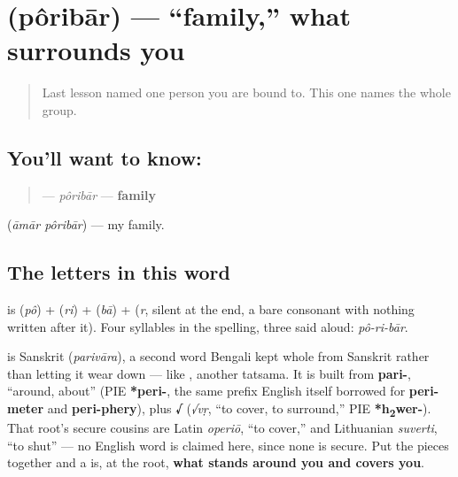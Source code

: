 \section[pôribār]{ (pôribār) — \textquotedblleft{}family,\textquotedblright{} what surrounds you}

\label{lesson:BN-C11-poribar}



\begin{quote}
Last lesson named one person you are bound to. This one names the whole group.
\end{quote}

\subsection*{You'll want to know: }
\begin{quote}
\textbf{} — \emph{pôribār} — \textbf{family}
\end{quote}

\textbf{ } (\emph{āmār pôribār}) — my family.

\subsection*{The letters in this word}
\textbf{} is \textbf{} (\emph{pô}) + \textbf{} (\emph{ri}) + \textbf{} (\emph{bā}) + \textbf{} (\emph{r}, silent at the end, a bare consonant with nothing written after it). Four syllables in the spelling, three said aloud: \emph{pô-ri-bār}.

\begin{cousinweb}
\textbf{} is Sanskrit \textbf{} (\emph{parivāra}), a second word Bengali kept whole from Sanskrit rather than letting it wear down — like , another tatsama. It is built from \textbf{pari-}, \textquotedblleft{}around, about\textquotedblright{} (PIE \textbf{*peri-}, the same prefix English itself borrowed for \textbf{peri-meter} and \textbf{peri-phery}), plus \textbf{√} (\emph{√vṛ}, \textquotedblleft{}to cover, to surround,\textquotedblright{} PIE \textbf{*h\textsubscript{2}wer-}). That root's secure cousins are Latin \emph{operiō}, \textquotedblleft{}to cover,\textquotedblright{} and Lithuanian \emph{suverti}, \textquotedblleft{}to shut\textquotedblright{} — no English word is claimed here, since none is secure. Put the pieces together and a  is, at the root, \textbf{what stands around you and covers you}.
\end{cousinweb}

